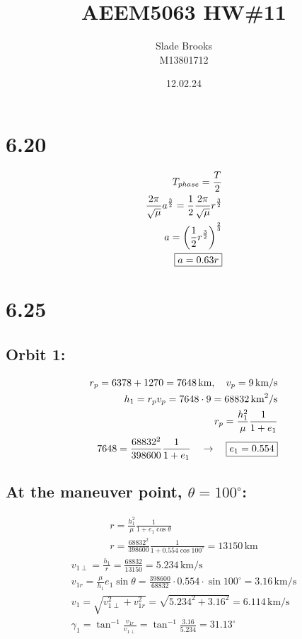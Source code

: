 \documentclass[12 pt]{article}
\title{AEEM5063 HW\#11}
\date{12.02.24}
\author{Slade Brooks \\ M13801712}
\begin{document}
\maketitle

\section*{6.20}
\begin{align*}
    T_{phase}=\frac{T}{2} \\
    \frac{2\pi}{\sqrt{\mu}}a^{\frac{3}{2}}=\frac{1}{2}\frac{2\pi}{\sqrt{\mu}}r^{\frac{3}{2}} \\
    a=\left(\frac{1}{2}r^{\frac{3}{2}}\right)^{\frac{2}{3}} \\
    \fbox{$a=0.63r$}
\end{align*}
\pagebreak

\section*{6.25}

\subsection*{Orbit 1:}
\begin{align*}
    r_p = 6378 + 1270 = 7648 \, \text{km}, \quad v_p = 9 \, \text{km/s} \\
    h_1 = r_p v_p = 7648 \cdot 9 = 68832 \, \text{km}^2/\text{s} \\
    r_p = \frac{h_1^2}{\mu} \frac{1}{1 + e_1} \\
    7648 = \frac{68832^2}{398600} \frac{1}{1 + e_1} \quad \rightarrow \quad \fbox{$e_1 = 0.554$}
\end{align*}

\subsection*{At the maneuver point, $\theta = 100^{\circ}$:}
\begin{align*}
    r = \frac{h_1^2}{\mu} \frac{1}{1 + e_1 \cos \theta} \\
    r = \frac{68832^2}{398600} \frac{1}{1 + 0.554 \cos 100^{\circ}} = 13150 \, \text{km}
\end{align*}
\begin{align*}
    v_{1\perp} = \frac{h_1}{r} = \frac{68832}{13150} = 5.234 \, \text{km/s} \\
    v_{1r} = \frac{\mu}{h_1} e_1 \sin \theta = \frac{398600}{68832} \cdot 0.554 \cdot \sin 100^{\circ} = 3.16 \, \text{km/s} \\
    v_1 = \sqrt{v_{1\perp}^2 + v_{1r}^2} = \sqrt{5.234^2 + 3.16^2} = 6.114 \, \text{km/s} \\
    \gamma_1 = \tan^{-1} \frac{v_{1r}}{v_{1\perp}} = \tan^{-1} \frac{3.16}{5.234} = 31.13^{\circ}
\end{align*}
\end{document}
